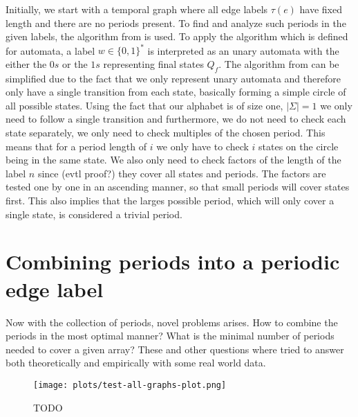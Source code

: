 Initially, we start with a temporal graph where all edge labels $\tau(e)$ have fixed length and there are no periods present. To find and analyze such periods in the given labels, the algorithm from \cite{DBLP:journals/corr/abs-2107-04683} is used. To apply the algorithm which is defined for automata, a label $ w \in \{0,1\}^*$ is interpreted as an unary automata with the either the $0s$ or the $1s$ representing final states $Q_f$. The algorithm from \cite{DBLP:journals/corr/abs-2107-04683} can be simplified due to the fact that we only represent unary automata and therefore only have a single transition from each state, basically forming a simple circle of all possible states. Using the fact that our alphabet is of size one, $|\Sigma| = 1$ we only need to follow a single transition and furthermore, we do not need to check each state separately, we only need to check multiples of the chosen period. This means that for a period length of $i$ we only have to check $i$ states on the circle being in the same state. We also only need to check factors of the length of the label $n$ since (evtl proof?) they cover all states and periods.
The factors are tested one by one in an ascending manner, so that small periods will cover states first. This also implies that the larges possible period, which will only cover a single state, is considered a trivial period.

\section{Combining periods into a periodic edge label}

Now with the collection of periods, novel problems arises. How to combine the periods in the most optimal manner? What is the minimal number of periods needed to cover a given array? These and other questions where tried to answer both theoretically and empirically with some real world data.

\begin{figure}
	\texttt{[image: plots/test-all-graphs-plot.png]}
	\label{plot}
	\caption{TODO}
\end{figure}

